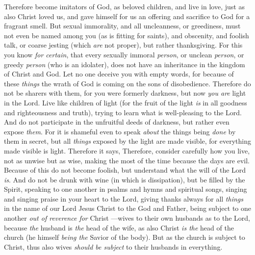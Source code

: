 \begin{biblechapter} %
 Therefore become imitators of God, as beloved children,
\verse and live in love, just as also Christ loved us, and gave himself for us an offering and sacrifice to God for a fragrant smell.
\verse But sexual immorality, and all uncleanness, or greediness, must not even be named among you (as is fitting for saints),
\verse and obscenity, and foolish talk, or coarse jesting (which \textit{are} not proper), but rather thanksgiving.
\verse For this you know \textit{for certain}, that every sexually immoral \textit{person}, or unclean \textit{person}, or greedy \textit{person} (who is an idolater), does not have an inheritance in the kingdom of Christ and God.
\verse Let no one deceive you with empty words, for because of these \textit{things} the wrath of God is coming on the sons of disobedience.
 Therefore do not be sharers with them,
\verse for you were formerly darkness, but now \textit{you are} light in the Lord. Live like children of light
\verse (for the fruit of the light \textit{is} in all goodness and righteousness and truth),
\verse trying to learn what is well-pleasing to the Lord.
\verse And do not participate in the unfruitful deeds of darkness, but rather even expose \textit{them}.
\verse For it is shameful even to speak \textit{about} the things being \textit{done} by them in secret,
\verse but all \textit{things} exposed by the light are made visible,
\verse for everything made visible is light. Therefore it says,
\verse Therefore, consider carefully how you live, not as unwise but as wise,
\verse making the most of the time because the days are evil.
 Because of this do not become foolish, but understand what the will of the Lord \textit{is}.
\verse And do not be drunk with wine (in which is dissipation), but be filled by the Spirit,
\verse speaking to one another in psalms and hymns and spiritual songs, singing and singing praise in your heart to the Lord,
\verse giving thanks always for all \textit{things} in the name of our Lord Jesus Christ to the God and Father,
\verse being subject to one another \textit{out of reverence for} Christ
\verse —wives to their own husbands as to the Lord,
\verse because \textit{the} husband is \textit{the} head of the wife, as also Christ \textit{is the} head of the church (he himself \textit{being the} Savior of the body).
\verse But as the church is subject to Christ, thus also wives \textit{should be subject} to their husbands in everything.

\end{biblechapter}
